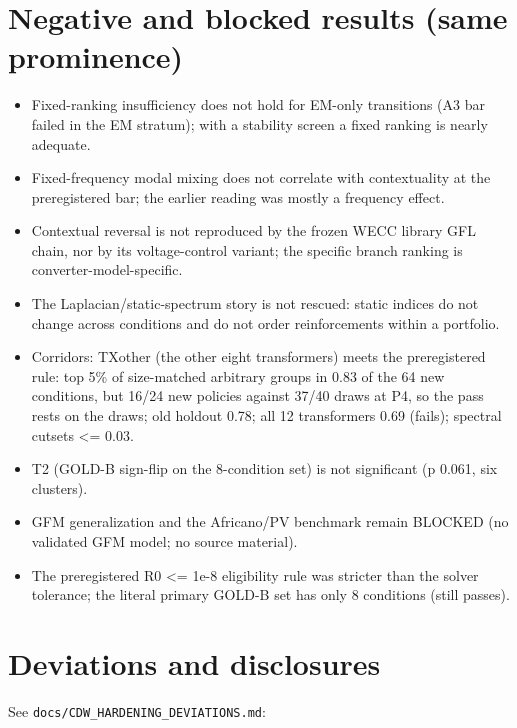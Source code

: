\documentclass[10pt,a4paper]{article}
\begin{document}
\section{Negative and blocked results (same prominence)}
\begin{itemize}
\item Fixed-ranking insufficiency does not hold for EM-only transitions (A3 bar failed in the EM stratum); with a stability screen a fixed ranking is nearly adequate.
\item Fixed-frequency modal mixing does not correlate with contextuality at the preregistered bar; the earlier reading was mostly a frequency effect.
\item Contextual reversal is not reproduced by the frozen WECC library GFL chain, nor by its voltage-control variant; the specific branch ranking is converter-model-specific.
\item The Laplacian/static-spectrum story is not rescued: static indices do not change across conditions and do not order reinforcements within a portfolio.
\item Corridors: TXother (the other eight transformers) meets the preregistered rule: top 5\% of size-matched arbitrary groups in 0.83 of the 64 new conditions, but 16/24 new policies against 37/40 draws at P4, so the pass rests on the draws; old holdout 0.78; all 12 transformers 0.69 (fails); spectral cutsets <= 0.03.
\item T2 (GOLD-B sign-flip on the 8-condition set) is not significant (p 0.061, six clusters).
\item GFM generalization and the Africano/PV benchmark remain BLOCKED (no validated GFM model; no source material).
\item The preregistered R0 <= 1e-8 eligibility rule was stricter than the solver tolerance; the literal primary GOLD-B set has only 8 conditions (still passes).
\end{itemize}
\section{Deviations and disclosures}
See \texttt{docs/\allowbreak{}CDW\_\allowbreak{}HARDENING\_\allowbreak{}DEVIATIONS.md}:
\end{document}
